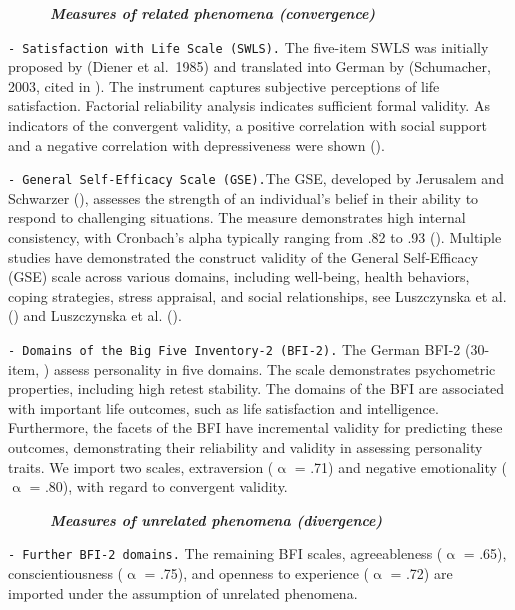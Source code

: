 \documentclass[
  man,floatsintext]{apa7}
\begin{document}
~~~~~~\textbf{\emph{Measures of related phenomena (convergence)}}

\texttt{-\ Satisfaction\ with\ Life\ Scale\ (SWLS).} The five-item SWLS was initially proposed by (Diener et al.~1985) and translated into German by (Schumacher, 2003, cited in ). The instrument captures subjective perceptions of life satisfaction. Factorial reliability analysis indicates sufficient formal validity. As indicators of the convergent validity, a positive correlation with social support and a negative correlation with depressiveness were shown ().

\texttt{-\ General\ Self-Efficacy\ Scale\ (GSE).}The GSE, developed by Jerusalem and Schwarzer (), assesses the strength of an individual's belief in their ability to respond to challenging situations. The measure demonstrates high internal consistency, with Cronbach's alpha typically ranging from .82 to .93 (). Multiple studies have demonstrated the construct validity of the General Self-Efficacy (GSE) scale across various domains, including well-being, health behaviors, coping strategies, stress appraisal, and social relationships, see Luszczynska et al. () and Luszczynska et al. ().

\texttt{-\ Domains\ of\ the\ Big\ Five\ Inventory-2\ (BFI-2).} The German BFI-2 (30-item, ) assess personality in five domains. The scale demonstrates psychometric properties, including high retest stability. The domains of the BFI are associated with important life outcomes, such as life satisfaction and intelligence. Furthermore, the facets of the BFI have incremental validity for predicting these outcomes, demonstrating their reliability and validity in assessing personality traits. We import two scales, extraversion (\(\upalpha\) = .71) and negative emotionality (\(\upalpha\) = .80), with regard to convergent validity.

~~~~~~\textbf{\emph{Measures of unrelated phenomena (divergence)}}

\texttt{-\ Further\ BFI-2\ domains.} The remaining BFI scales, agreeableness (\(\upalpha\) = .65), conscientiousness (\(\upalpha\) = .75), and openness to experience (\(\upalpha\) = .72) are imported under the assumption of unrelated phenomena.
\end{document}

